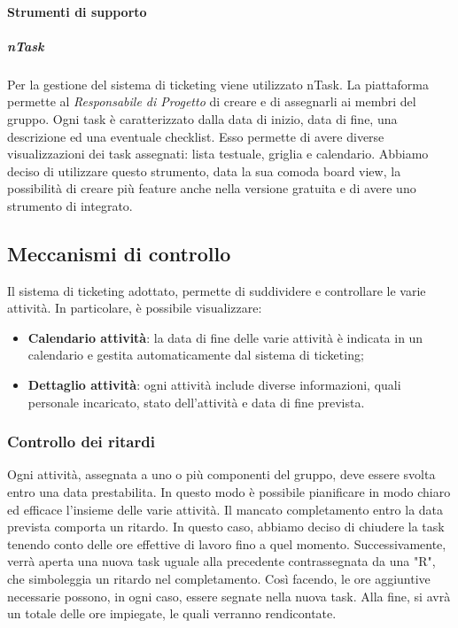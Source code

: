 \paragraph{Strumenti di supporto}
\subparagraph{nTask} \Spazio
Per la gestione del sistema di ticketing viene utilizzato nTask. La piattaforma permette al \emph{Responsabile di Progetto} di creare  e di assegnarli ai membri del gruppo. Ogni task è caratterizzato dalla data di inizio, data di fine, una descrizione ed una eventuale checklist. Esso permette di avere diverse visualizzazioni dei task assegnati: lista testuale, griglia e calendario. Abbiamo deciso di utilizzare questo strumento, data la sua comoda board view, la possibilità di creare più feature anche nella versione gratuita e di avere uno strumento di  integrato.

\subsection{Meccanismi di controllo}
Il sistema di ticketing adottato, permette di suddividere e controllare le varie attività. In particolare, è possibile visualizzare:
\begin{itemize}
\item{\textbf{Calendario attività}}: la data di fine delle varie attività è indicata in un calendario e gestita automaticamente dal sistema di ticketing;  
\item{\textbf{Dettaglio attività}}: ogni attività include diverse informazioni, quali personale incaricato, stato dell'attività e data di fine prevista. 
\end{itemize}
\subsubsection{Controllo dei ritardi}
Ogni attività, assegnata a uno o più componenti del gruppo, deve essere svolta entro una data prestabilita. In questo modo è possibile pianificare in modo chiaro ed efficace l'insieme delle varie attività. Il mancato completamento entro la data prevista comporta un ritardo. In questo caso, abbiamo deciso di chiudere la task tenendo conto delle ore effettive di lavoro fino a quel momento. Successivamente, verrà aperta una nuova task uguale alla precedente contrassegnata da una "R", che simboleggia un ritardo nel completamento. Così facendo, le ore aggiuntive necessarie possono, in ogni caso, essere segnate nella nuova task. Alla fine, si avrà un totale delle ore impiegate, le quali verranno rendicontate.

